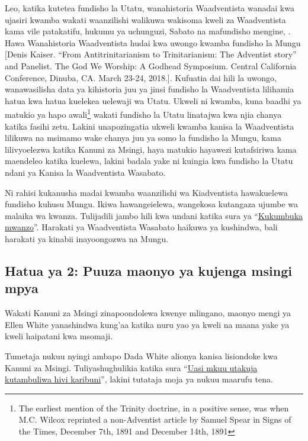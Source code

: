 Leo, katika kutetea fundisho la Utatu, wanahistoria Waadventista wanadai kwa ujasiri kwamba wakati waanzilishi walikuwa wakisoma kweli za Waadventista kama vile patakatifu, hukumu ya uchunguzi, Sabato na mafundisho mengine, . Hawa Wanahistoria Waadventista hudai kwa uwongo kwamba fundisho la Mungu [Denis Kaiser. “From Antitrinitarianism to Trinitarianism: The Adventist story” and Panelist. The God We Worship: A Godhead Symposium. Central California Conference, Dinuba, CA. March 23-24, 2018.]. Kufuatia dai hili la uwongo, wanawasilisha data ya kihistoria juu ya jinsi fundisho la Waadventista lilihamia hatua kwa hatua kuelekea uelewaji wa Utatu. Ukweli ni kwamba, kuna baadhi ya matukio ya hapo awali\footnote{The earliest mention of the Trinity doctrine, in a positive sense, was when M.C. Wilcox reprinted a non-Adventist article by Samuel Spear in Signs of the Times, December 7th, 1891 and December 14th, 1891} wakati fundisho la Utatu linatajwa kwa njia chanya katika fasihi zetu. Lakini unapozingatia ukweli kwamba kanisa la Waadventista lilikuwa na msimamo wake chanya juu ya somo la fundisho la Mungu, kama lilivyoelezwa katika Kanuni za Msingi, haya matukio hayawezi kutafsiriwa kama maendeleo katika kuelewa, lakini badala yake ni kuingia kwa fundisho la Utatu ndani ya Kanisa la Waadventista Wasabato.

Ni rahisi kukanusha madai kwamba waanzilishi wa Kiadventista hawakuelewa fundisho kuhusu Mungu. Ikiwa hawangeielewa, wangekosa kutangaza ujumbe wa malaika wa kwanza. Tulijadili jambo hili kwa undani katika sura ya “\hyperref[chap:remembering-the-beginning]{Kukumbuka mwanzo}”. Harakati ya Waadventista Wasabato haikuwa ya kushindwa, bali harakati ya kinabii inayoongozwa na Mungu.

\subsection*{Hatua ya 2: Puuza maonyo ya kujenga msingi mpya}

Wakati Kanuni za Msingi zinapoondolewa kwenye mlingano, maonyo mengi ya Ellen White yanashindwa kung'aa katika nuru yao ya kweli na maana yake ya kweli haipatani kwa msomaji.

Tumetaja nukuu nyingi ambapo Dada White alionya kanisa lisiondoke kwa Kanuni za Msingi. Tuliyashughulikia katika sura “\hyperref[chap:apostasy]{Uasi mkuu utakuja kutambuliwa hivi karibuni}”, lakini tutataja moja ya nukuu maarufu tena.

